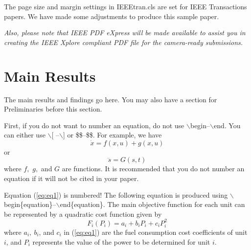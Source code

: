 \documentclass[conference]{IEEEtran}
\begin{document}
    
The page size and margin settings in IEEEtran.cls are set for 
IEEE Transactions papers. We have made some adjustments to 
produce this sample paper.

{\it Also, please note that IEEE PDF eXpress will be made available to assist you in 
creating the IEEE Xplore compliant PDF file for the camera-ready submissions.}

%

\section{Main Results}
The main results and findings go here. You may also have a section for 
Preliminaries before this section.

First, if you do not want to number an equation, do not use
$\backslash$begin--$\backslash$end.
You can either use $\backslash$[ --$\backslash$] or
\$\$--\$\$. For example, we have
$$\dot x= f( x,u) + g (x,u)$$
or 
\[\ddot s=G(s,t)\]
where $f,$ $g,$ and $G$ are functions. It is recommended that you do not 
number an equation if it will not be cited in your paper.

Equation (\ref{eq:eq1}) is numbered!
The following equation is produced 
using $\backslash$begin\{equation\}--$\backslash$end\{equation\}.
The main objective function for each unit can be represented by a 
quadratic cost function given by
\begin{equation}
F_i(P_i)=a_{i}+b_{i}P_i+c_{i}P_{i}^2
\label{eq:eq1}
\end{equation}
where  $a_{i},\ b_{i}$, and $c_{i}$ in (\ref{eq:eq1}) are the fuel consumption cost coefficients 
of unit $i$, and $P_i$ represents the value of the power to be 
determined for unit $i$.
\end{document}
